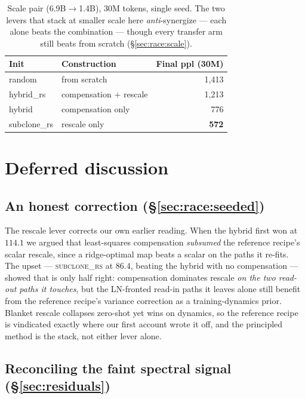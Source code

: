 \begin{table}[h]
\centering
\caption{Scale pair (6.9B$\to$1.4B), 30M tokens, single seed. The two levers that
stack at smaller scale here \emph{anti}-synergize --- each alone beats the
combination --- though every transfer arm still beats from scratch
(\S\ref{sec:race:scale}).}
\label{tab:scale}
\begin{tabular}{llr}
\toprule
Init & Construction & Final ppl (30M) \\
\midrule
random       & from scratch             & 1{,}413 \\
hybrid\_rs   & compensation $+$ rescale & 1{,}213 \\
hybrid       & compensation only        & 776 \\
subclone\_rs & rescale only             & \textbf{572} \\
\bottomrule
\end{tabular}
\end{table}

\section{Deferred discussion}
\label{app:discussion}

\subsection{An honest correction (\S\ref{sec:race:seeded})}
\label{app:correction}

The rescale lever corrects our own earlier reading. When the hybrid first won at
$114.1$ we argued that least-squares compensation \emph{subsumed} the reference
recipe's scalar rescale, since a ridge-optimal map beats a scalar on the paths it
re-fits. The upset --- \textsc{subclone\_rs} at $86.4$, beating the hybrid with no
compensation --- showed that is only half right: compensation dominates rescale
\emph{on the two read-out paths it touches}, but the LN-fronted read-in paths it
leaves alone still benefit from the reference recipe's variance correction as a
training-dynamics prior. Blanket rescale collapses zero-shot yet wins on
dynamics, so the reference recipe is vindicated exactly where our first account
wrote it off, and the principled method is the stack, not either lever alone.

\subsection{Reconciling the faint spectral signal (\S\ref{sec:residuals})}
\label{app:reconcile}

